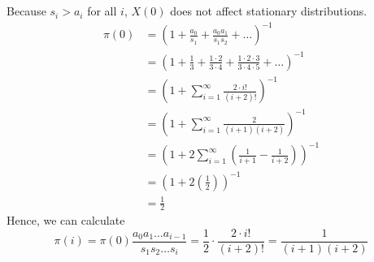 \documentclass[11pt]{article}
\begin{document}
\section{}
Because $s_i > a_i$ for all $i$, $X(0)$ does not affect stationary distributions.
\begin{equation*}
    \begin{aligned}
        \pi(0) &= \left(1 + \frac{a_0}{s_1} + \frac{a_0 a_1}{s_1 s_2} + \hdots \right)^{-1} \\
        &= \left(1 + \frac{1}{3} + \frac{1 \cdot 2}{3 \cdot 4} + \frac{1 \cdot 2 \cdot 3}{3 \cdot 4 \cdot 5} + \hdots\right)^{-1} \\
        &= \left(1 + \sum_{i=1}^\infty \frac{2 \cdot i!}{(i+2)!} \right)^{-1} \\
        &= \left(1 + \sum_{i=1}^\infty \frac{2}{(i+1)(i+2)} \right)^{-1} \\
        &= \left(1 + 2 \sum_{i=1}^\infty \left(\frac{1}{i+1} - \frac{1}{i+2} \right)\right)^{-1} \\
        &= \left(1 + 2 \left(\frac{1}{2}\right) \right)^{-1} \\
        &= \frac{1}{2}
    \end{aligned}
\end{equation*}
Hence, we can calculate 
\[
    \pi(i) = \pi(0) \frac{a_0 a_1 \hdots a_{i-1}}{s_1 s_2 \hdots s_i} = \frac{1}{2} \cdot \frac{2 \cdot i!}{(i+2)!} = \frac{1}{(i+1)(i+2)}
\]
\end{document}
